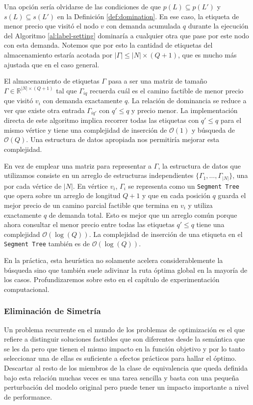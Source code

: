 Una opción sería olvidarse de las condiciones de que $p(L) \subseteq p(L')$ y $s(L) \subseteq s(L')$ en la Definición \ref{def:domination}. En ese caso, la etiqueta de menor precio que visitó el nodo $v$ con demanda acumulada $q$ durante la ejecución del Algoritmo \ref{al:label-setting} dominaría a cualquier otra que pase por este nodo con esta demanda. Notemos que por esto la cantidad de etiquetas del almacenamiento estaría acotada por $|\Gamma| \leq |N| \times (Q+1)$, que es mucho más ajustada que en el caso general.

El almacenamiento de etiquetas $\Gamma$ pasa a ser una matriz de tamaño $\Gamma \in \mathbb{R}^{|N| \times (Q+1)}$ tal que $\Gamma_{iq}$ recuerda cuál es el camino factible de menor precio que visitó $v_i$ con demanda exactamente $q$. La relación de dominancia se reduce a ver que existe otra entrada $\Gamma_{iq'}$ con $q' \leq q$ y precio menor. La implementación directa de este algoritmo implica recorrer todas las etiquetas con $q' \leq q$ para el mismo vértice y tiene una complejidad de inserción de $\mathcal{O}(1)$ y búsqueda de $\mathcal{O}(Q)$. Una estructura de datos apropiada nos permitiría mejorar esta complejidad.

En vez de emplear una matriz para representar a $\Gamma$, la estructura de datos que utilizamos consiste en un arreglo de estructuras independientes $\{\Gamma_1, \dots, \Gamma_{|N|}\}$, una por cada vértice de $|N|$. En vértice $v_i$, $\Gamma_i$ se representa como un \texttt{Segment Tree} \cite{cormen} que opera sobre un arreglo de longitud $Q + 1$ y que en cada posición $q$ guarda el mejor precio de un camino parcial factible que termina en $v_i$ y utiliza exactamente $q$ de demanda total. Esto es mejor que un arreglo común porque ahora consultar el menor precio entre todas las etiquetas $q' \leq q$ tiene una complejidad $\mathcal{O}(\log(Q))$. La complejidad de inserción de una etiqueta en el \texttt{Segment Tree} también es de $\mathcal{O}(\log(Q))$.

En la práctica, esta heurística no solamente acelera considerablemente la bús\-queda sino que también suele adivinar la ruta óptima global en la mayoría de los casos. Profundizaremos sobre esto en el capítulo de experimentación computacional.


\subsubsection{Eliminación de Simetría}

Un problema recurrente en el mundo de los problemas de optimización es el que refiere a distinguir soluciones factibles que son diferentes desde la semántica que se les da pero que tienen el mismo impacto en la función objetivo y por lo tanto seleccionar una de ellas es suficiente a efectos prácticos para hallar el óptimo. Descartar al resto de los miembros de la clase de equivalencia que queda definida bajo esta relación muchas veces es una tarea sencilla y basta con una pequeña perturbación del modelo original pero puede tener un impacto importante a nivel de performance. 

